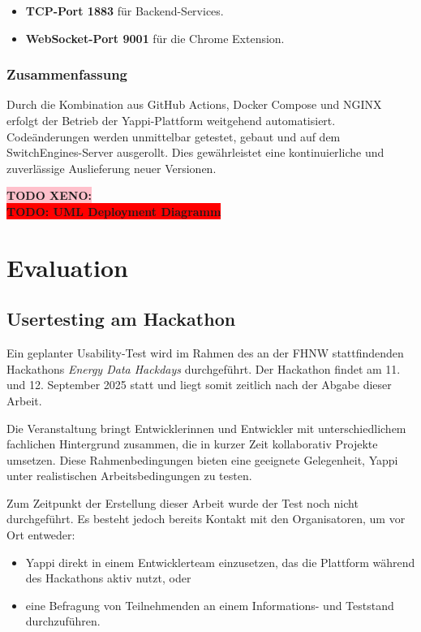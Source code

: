 \documentclass[12pt,a4paper]{report}
\newcommand{\todo}[1]{\colorbox{red}{\textbf{TODO: #1}}\\}
\newcommand{\xeno}[1]{\colorbox{pink}{\textbf{TODO XENO: #1}}\\}
\begin{document}
    \begin{itemize}
        \item \textbf{TCP-Port 1883} für Backend-Services.
        \item \textbf{WebSocket-Port 9001} für  die Chrome Extension.
    \end{itemize}

    \subsection{Zusammenfassung}

    Durch die Kombination aus GitHub Actions, Docker Compose und NGINX erfolgt der Betrieb der Yappi-Plattform weitgehend automatisiert.
    Codeänderungen werden unmittelbar getestet, gebaut und auf dem SwitchEngines-Server ausgerollt. Dies gewährleistet eine kontinuierliche und zuverlässige Auslieferung neuer Versionen.

\xeno{}
\todo{UML Deployment Diagramm}


\chapter{Evaluation}

 \section{Usertesting am Hackathon}

 Ein geplanter Usability-Test wird im Rahmen des an der FHNW stattfindenden Hackathons \textit{Energy Data Hackdays} durchgeführt.
 Der Hackathon findet am 11. und 12. September 2025 statt und liegt somit zeitlich nach der Abgabe dieser Arbeit.

 Die Veranstaltung bringt Entwicklerinnen und Entwickler mit unterschiedlichem fachlichen Hintergrund zusammen, die in
 kurzer Zeit kollaborativ Projekte umsetzen. Diese Rahmenbedingungen bieten eine geeignete Gelegenheit, Yappi unter
 realistischen Arbeitsbedingungen zu testen.

 Zum Zeitpunkt der Erstellung dieser Arbeit wurde der Test noch nicht durchgeführt. Es besteht jedoch bereits Kontakt mit
 den Organisatoren, um vor Ort entweder:
 \begin{itemize}
     \item Yappi direkt in einem Entwicklerteam einzusetzen, das die Plattform während des Hackathons aktiv nutzt, oder
     \item eine Befragung von Teilnehmenden an einem Informations- und Teststand durchzuführen.
 \end{itemize}
\end{document}
